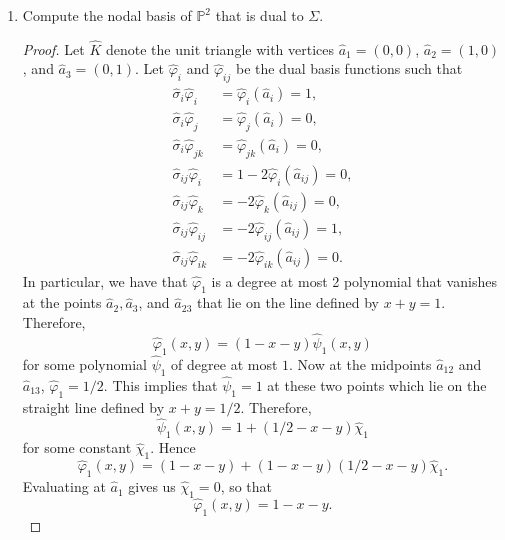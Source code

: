 \documentclass{article}
\begin{document}
\begin{enumerate}
\begin{proof}
		      Now since $r(a_k) = 0$ but $L_{ij}$ and $L_{ij,jk}$ do not vanish at these points, we conclude that $C = 0$, so that $r = 0$.
		      Hence $p = q$, so the dofs are unisolvent.
	      \end{proof}
	\item Compute the nodal basis of $\mathbb P^2$ that is dual to $\Sigma$.
	      \begin{proof}
		      Let $\widehat K$ denote the unit triangle with vertices $\widehat a_1 = (0,0)$, $\widehat a_2 = (1,0)$, and $\widehat a_3 = (0,1)$.
		      Let $\widehat \varphi_i$ and $\widehat \varphi_{ij}$ be the dual basis functions such that
		      \begin{align*}
			      \widehat\sigma_i\widehat\varphi_i       & = \widehat\varphi_i(\widehat a_i) = 1,          \\
			      \widehat\sigma_i\widehat\varphi_j       & = \widehat\varphi_j(\widehat a_i) = 0,          \\
			      \widehat\sigma_i\widehat\varphi_{jk}    & = \widehat\varphi_{jk}(\widehat a_i) = 0,       \\
			      \widehat\sigma_{ij}\widehat\varphi_i    & = 1 - 2\widehat\varphi_i(\widehat a_{ij}) = 0,  \\
			      \widehat\sigma_{ij}\widehat\varphi_k    & =  -2\widehat\varphi_k(\widehat a_{ij}) = 0,    \\
			      \widehat\sigma_{ij}\widehat\varphi_{ij} & =  -2\widehat\varphi_{ij}(\widehat a_{ij}) = 1, \\
			      \widehat\sigma_{ij}\widehat\varphi_{ik} & =  -2\widehat\varphi_{ik}(\widehat a_{ij}) = 0.
		      \end{align*}
		      In particular, we have that $\widehat \varphi_1$ is a degree at most 2 polynomial that vanishes at the points $\widehat a_2, \widehat a_3$, and $\widehat a_{23}$ that lie on the line defined by $x+y=1$.
		      Therefore, \[\widehat\varphi_1(x,y) = (1-x-y)\widehat\psi_1(x,y)\] for some polynomial $\widehat\psi_1$ of degree at most $1$.
		      Now at the midpoints $\widehat a_{12}$ and $\widehat a_{13}$, $\widehat\varphi_1 = 1/2$.
		      This implies that $\widehat \psi_1 = 1$ at these two points which lie on the straight line defined by $x + y = 1/2$.
		      Therefore, \[\widehat\psi_1(x,y) = 1 + (1/2-x-y)\widehat\chi_1\] for some constant $\widehat \chi_1$.
		      Hence \[\widehat\varphi_1(x,y) = (1-x-y) + (1-x-y)(1/2-x-y)\widehat\chi_1.\]
		      Evaluating at $\widehat a_1$ gives us $\widehat \chi_1 = 0$, so that \[\widehat\varphi_1(x,y) = 1 - x - y.\]

\end{proof}
\end{enumerate}
\end{document}
